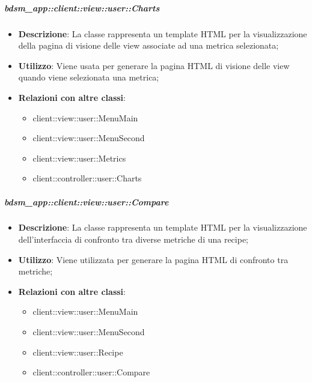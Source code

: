 		\subparagraph{bdsm\_app::client::view::user::Charts} %
		\label{subp:bdsm_app_client_view_user_charts}
			\begin{itemize}
				\item \textbf{Descrizione}: La classe rappresenta un template HTML per la visualizzazione della pagina di visione delle view associate ad una metrica selezionata;
				\item \textbf{Utilizzo}: Viene usata per generare la pagina HTML di visione delle view quando viene selezionata una metrica;
				\item \textbf{Relazioni con altre classi}: 		
					\begin{itemize}
						\item client::view::user::MenuMain
						\item client::view::user::MenuSecond
						\item client::view::user::Metrics
						\item client::controller::user::Charts
					\end{itemize}
			\end{itemize}

		\subparagraph{bdsm\_app::client::view::user::Compare} %
		\label{subp:bdsm_app_client_view_user_compare}
			\begin{itemize}
				\item \textbf{Descrizione}: La classe rappresenta un template HTML per la visualizzazione dell'interfaccia di confronto tra diverse metriche di una recipe;
				\item \textbf{Utilizzo}: Viene utilizzata per generare la pagina HTML di confronto tra metriche;
				\item \textbf{Relazioni con altre classi}: 		
					\begin{itemize}
						\item client::view::user::MenuMain
						\item client::view::user::MenuSecond
						\item client::view::user::Recipe
						\item client::controller::user::Compare
					\end{itemize}
			\end{itemize}

